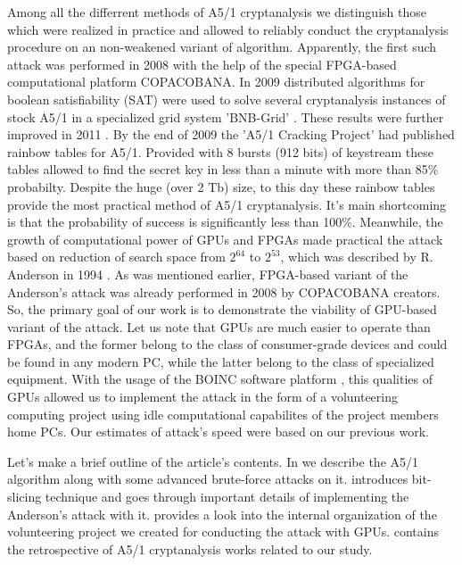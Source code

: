 \documentclass[runningheads,a4paper]{llncs}[2015/06/24]
\begin{document}
Among all the differrent methods of A5/1 cryptanalysis we distinguish those
which were realized in practice and allowed to reliably conduct the
cryptanalysis procedure on an non-weakened variant of algorithm. Apparently,
the first such attack was performed in 2008 with the help of the special
FPGA-based computational platform COPACOBANA\cite{COPAC_1}. In 2009 distributed
algorithms for boolean satisfiability (SAT) were used to solve several
cryptanalysis instances of stock A5/1 in a specialized grid system 'BNB-Grid'
\cite{TRUDY_ISA}. These results were further improved in 2011 \cite{SZBP}. By
the end of 2009 the 'A5/1 Cracking Project' had published rainbow tables
\cite{RAINBOW} for A5/1. Provided with 8 bursts (912 bits) of keystream these
tables allowed to find the secret key in less than a minute with more than 85\%
probabilty. Despite the huge (over 2 Tb) size, to this day these rainbow tables
provide the most practical method of A5/1 cryptanalysis.  It's main shortcoming
is that the probability of success is significantly less than 100\%. Meanwhile,
the growth of computational power of GPUs and FPGAs made practical the attack
based on reduction of search space from $2^64$ to $2^53$, which was described
by R.  Anderson in 1994 \cite{ANDERSON}. As was mentioned earlier, FPGA-based
variant of the Anderson's attack was already performed in 2008 by COPACOBANA
creators.  So, the primary goal of our work is to demonstrate the viability of
GPU-based variant of the attack. Let us note that GPUs are much easier to
operate than FPGAs, and the former belong to the class of consumer-grade
devices and could be found in any modern PC, while the latter belong to the
class of specialized equipment.  With the usage of the BOINC software platform
\cite{BOINC_C}, this qualities of GPUs allowed us to implement the attack in
the form of a volunteering computing project using idle computational
capabilites of the project members home PCs.  Our estimates of attack's speed
were based on our previous work\cite{BUL_SEM_2016}.

Let's make a brief outline of the article's contents. In  we
describe the A5/1 algorithm along with some advanced brute-force attacks on it.
 introduces bit-slicing technique and goes through important
details of implementing the Anderson's attack with it. 
provides a look into the internal organization of the volunteering project we
created for conducting the attack with GPUs.  contains the
retrospective of A5/1 cryptanalysis works related to our study.
\end{document}
